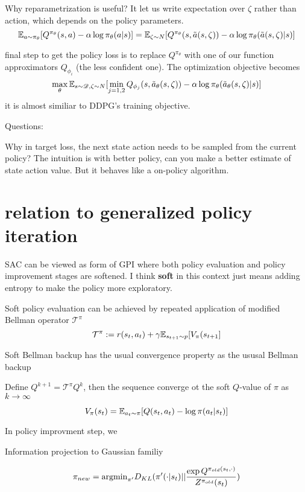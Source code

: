 \documentclass{article}
\newcommand{\tpi}{\mathcal{T}^{\pi}}
\begin{document}
Why reparametrization is useful?
It let us write expectation over $\zeta$ rather than action, which 
depends on the policy parameters.
\[
    \mathbb{E}_{a\sim\pi_{\theta}}[Q^{\pi_{\theta}}(s,a) - 
    \alpha\log\pi_{\theta}(a|s)] 
    = \mathbb{E}_{\zeta\sim N}[Q^{\pi_{\theta}}(s, \tilde a(s, \zeta))
    - \alpha\log \pi_{\theta}(\tilde a(s,\zeta)|s)]
\]

final step to get the policy loss is to replace $Q^{\pi_{\theta}}$
with one of our function approximators $Q_{\phi_i}$ (the less confident
one). The optimization objective becomes
\[
    \max_{\theta}\mathbb{E}_{s\sim\mathscr{D},\zeta\sim N}[
        \min_{j=1,2}Q_{\phi_j}(s, \tilde a_{\theta}(s,\zeta))
        - \alpha\log \pi_{\theta}(\tilde a_{\theta}(s,\zeta)|s)
    ]
\]
it is almost similiar to DDPG's training objective. 



Questions:

Why in target loss, the next state action needs to be sampled from the 
current policy? The intuition is with better policy, can you make a 
better estimate of state action value. But it behaves like a on-policy
algorithm.

\section{relation to generalized policy iteration}
SAC can be viewed as form of GPI where both policy evaluation and policy
improvement stages are softened.
I think \textbf{soft} in this context just means adding entropy to make the
policy more exploratory. 

Soft policy evaluation can be achieved by repeated application of modified
Bellman operator $\mathcal{T}^{\pi}$
\[
    \mathcal{T}^{\pi} := r(s_t,a_t) + \gamma \mathbb{E}_{s_{t+1} 
    \sim p}[V_{\pi}(s_{t+1}]
\]

Soft Bellman backup has the usual convergence property as the ususal 
Bellman backup

\begin{lemma}
    Define $Q^{k+1}=\tpi Q^k$, then the sequence converge ot the soft
    $Q$-value of $\pi$ as $k\rightarrow \infty$
\end{lemma}
\[
    V_{\pi}(s_t) = \mathbb{E}_{a_t\sim\pi}[Q(s_t, a_t) - \log \pi(a_t|s_t)]
\]


In policy improvment step, we 

Information projection to Gaussian familiy 

\[
    \pi_{new} = \text{argmin}_{\pi^{\prime}} D_{KL}(\pi^{\prime}(\cdot |s_t)
    || \frac{\exp{Q^{\pi_{old}(s_t, \cdot)}}}{Z^{\pi_{old}}(s_t)})
\]
\end{document}

